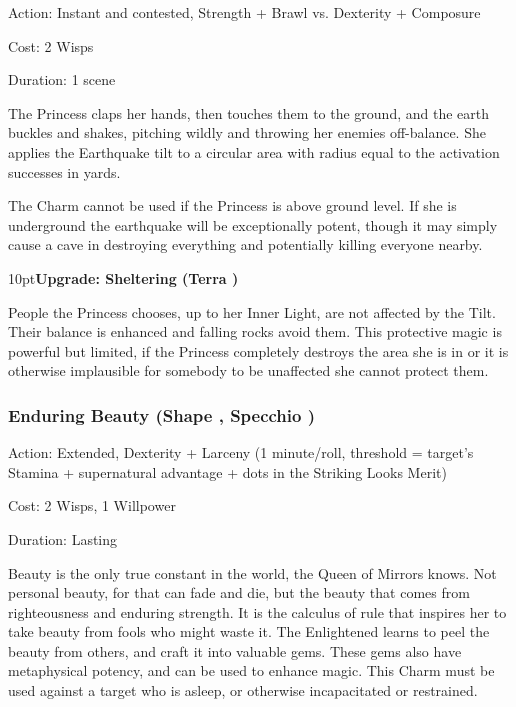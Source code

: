 \noindent Action: Instant and contested, Strength + Brawl vs. Dexterity + Composure

\noindent Cost: 2 Wisps

\noindent Duration: 1 scene

The Princess claps her hands, then touches them to the ground, and the earth buckles and shakes, pitching wildly and throwing her enemies off-balance. She applies the Earthquake tilt to a circular area with radius equal to the activation successes in yards. 

The Charm cannot be used if the Princess is above ground level. If she is underground the earthquake will be exceptionally potent, though it may simply cause a cave in destroying everything and potentially killing everyone nearby.

\begin{myindentpar}{10pt}\textbf{Upgrade: Sheltering (Terra \textbullet\textbullet\textbullet\textbullet)}

People the Princess chooses, up to her Inner Light, are not affected by the Tilt. Their balance is enhanced and falling rocks avoid them. This protective magic is powerful but limited, if the Princess completely destroys the area she is in or it is otherwise implausible for somebody to be unaffected she cannot protect them.\end{myindentpar}

\subsubsection*{Enduring Beauty (Shape \textbullet\textbullet\textbullet\textbullet, Specchio \textbullet\textbullet\textbullet\textbullet)}

\noindent Action: Extended, Dexterity + Larceny (1 minute/roll, threshold = target's Stamina + supernatural advantage + dots in the Striking Looks Merit)

\noindent Cost: 2 Wisps, 1 Willpower

\noindent Duration: Lasting

Beauty is the only true constant in the world, the Queen of Mirrors knows. Not personal beauty, for that can fade and die, but the beauty that comes from righteousness and enduring strength. It is the calculus of rule that inspires her to take beauty from fools who might waste it. The Enlightened learns to peel the beauty from others, and craft it into valuable gems. These gems also have metaphysical potency, and can be used to enhance magic. This Charm must be used against a target who is asleep, or otherwise incapacitated or restrained.

